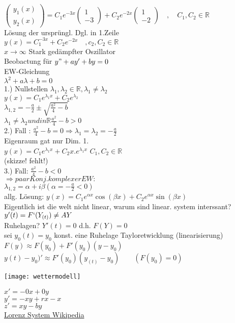 \begin{example}
			$\begin{pmatrix}
					y_1(x)\\
					y_2(x)
			\end{pmatrix}= C_1e^{-3x}	\begin{pmatrix}
			1\\
			-3
		\end{pmatrix}+C_2e^{-2x}\begin{pmatrix}
1\\
-2
	\end{pmatrix} \quad , \quad C_1,C_2\in \mathbb{R}$\\
	Lösung der ursprüngl. Dgl. in 1.Zeile\\
$y(x) = C_1^{-3x}+C_2 e^{-2x} \quad , c_2,C_2 \in \mathbb{R}$\\
$x  \to \infty  $ Stark gedämpfter Oszillator\\
Beobactung für $y"+ay'+by=0$\\
EW-Gleichung \\
$\lambda^2 +a\lambda +b=0$\\
1.) Nullstellen $\lambda_1,\lambda_2\in \mathbb{R}, \lambda_1\neq \lambda_2$\\
$y(x)=C_1e^{\lambda_1 x}+C_2e^{\lambda_2}$\\
$\lambda_{1,2} =-\frac{a}{2}\pm \sqrt{\frac{a^2}{4}-b}$\\
$\lambda_1  \neq \lambda_2 und in \mathbb{R} \frac{a^2}{4}-b >0$\\
2.) Fall : $\frac{a^2}{4}-b=0 \Rightarrow \lambda_1 =\lambda_2=- \frac{a}{2}$\\
Eigenraum gat nur Dim. 1.\\
$y(x)=C_1e^{\lambda_1 x}+ C_2 x. e^{\lambda_1 x}$    $C_1,C_2 \in \mathbb{R}$\\
(skizze! fehlt!)\\
3.) Fall: $\frac{a^2}{4}-b<0$\\
$ \Rightarrow paar Konj. komplexer EW:$\\
$\lambda_{1,2}=\alpha +i\beta (\alpha=- \frac{a}{2}<0)$\\
allg. Lösung:
$y(x)= C_1 e^{\alpha x} \cos (\beta x) +C_2 e^{\alpha x} \sin (\beta x)$\\
Eigentlich ist die welt nicht linear, warum sind linear. system interssant?\\
$y'(t)=F`(Y_{(t)} ) \neq AY$\\
Ruhelagen? $Y'(t)= 0 $ d.h. $ F(Y)=0$\\
sei   $ y_0(t)=y_0 $ konst. eine Ruhelage Tayloretwicklung (linearisierung)\\
$ F(y) \approx F(y_0)+F'(y_0)(y-y_0)$\\
$y(t)-y_0)'\approx F'(y_0)(y_{(t)}-y_0) \qquad (F(y_0)=0)$
 \end{example}
 
\begin{example}

	\texttt{[image: wettermodell]}
	


	$x'=-0x+0y$\\
	$y'=-xy+rx-x$\\
	$z'=xy-by$\\
\href{ https://en.wikipedia.org/wiki/Lorenz_system }{Lorenz System Wikipedia}


\end{example}